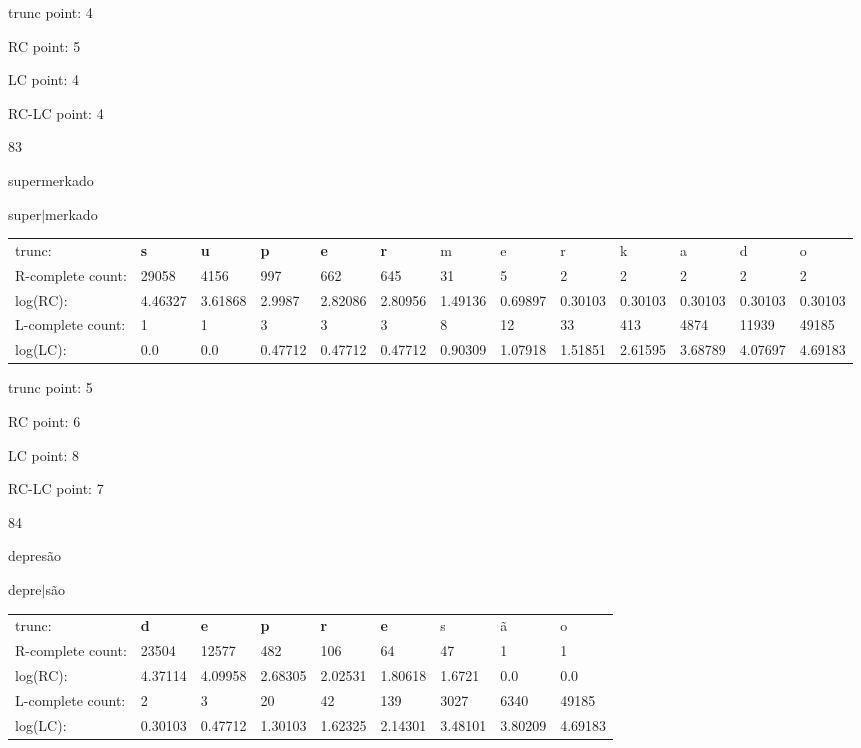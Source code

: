 \documentclass{article}
\begin{document}
trunc point: 4

RC point: 5

LC point: 4

RC-LC point: 4

\vspace{3em}



83

supermerkado

super$|$merkado

\vspace{1em}

\begin{tabular}{l|llllllllllll}

trunc: & {\color{red}\bf s} & {\color{red}\bf u} & {\color{red}\bf p} & {\color{red}\bf e} & {\color{red}\bf r} & m & e & r & k & a & d & o \\ 
R-complete count: & 29058 & 4156 & 997 & 662 & 645 & 31 & 5 & 2 & 2 & 2 & 2 & 2 \\ 
log(RC): & 4.46327 & 3.61868 & 2.9987 & 2.82086 & 2.80956 & 1.49136 & 0.69897 & 0.30103 & 0.30103 & 0.30103 & 0.30103 & 0.30103 \\ 
L-complete count: & 1 & 1 & 3 & 3 & 3 & 8 & 12 & 33 & 413 & 4874 & 11939 & 49185 \\ 
log(LC): & 0.0 & 0.0 & 0.47712 & 0.47712 & 0.47712 & 0.90309 & 1.07918 & 1.51851 & 2.61595 & 3.68789 & 4.07697 & 4.69183 \\ 
\end{tabular}

trunc point: 5

RC point: 6

LC point: 8

RC-LC point: 7

\vspace{3em}



84

depresão

depre$|$são

\vspace{1em}

\begin{tabular}{l|llllllll}

trunc: & {\color{red}\bf d} & {\color{red}\bf e} & {\color{red}\bf p} & {\color{red}\bf r} & {\color{red}\bf e} & s & ã & o \\ 
R-complete count: & 23504 & 12577 & 482 & 106 & 64 & 47 & 1 & 1 \\ 
log(RC): & 4.37114 & 4.09958 & 2.68305 & 2.02531 & 1.80618 & 1.6721 & 0.0 & 0.0 \\ 
L-complete count: & 2 & 3 & 20 & 42 & 139 & 3027 & 6340 & 49185 \\ 
log(LC): & 0.30103 & 0.47712 & 1.30103 & 1.62325 & 2.14301 & 3.48101 & 3.80209 & 4.69183 \\ 
\end{tabular}
\end{document}
